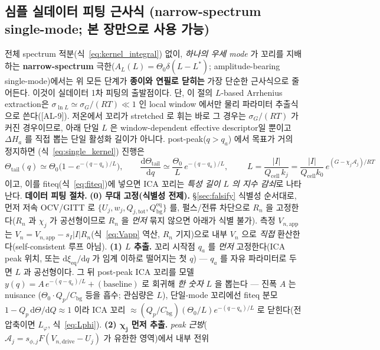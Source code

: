 \documentclass[11pt,a4paper]{article}
\newcommand{\dd}{\mathrm{d}}
\newcommand{\eq}{\mathrm{eq}}
\newcommand{\app}{\mathrm{app}}
\newcommand{\drive}{\mathrm{drive}}
\newcommand{\bg}{\mathrm{bg}}
\newcommand{\cell}{\mathrm{cell}}
\newcommand{\tot}{\mathrm{tot}}
\newcommand{\AL}[1]{\textsf{[AL-#1]}}
\begin{document}
\subsection{심플 실데이터 피팅 근사식 (narrow-spectrum single-mode; 본 장만으로 사용 가능)}\label{sec:ch1_simplefit}
전체 spectrum 적분(식~\eqref{eq:kernel_integral}) 없이, \emph{하나의 우세 mode} 가 꼬리를 지배하는 \textbf{narrow-spectrum}
극한($A_L(L)=\Theta_0\delta(L-L^\ast)$; amplitude-bearing single-mode)에서는 위 모든 단계가 \textbf{종이와 연필로 닫히는}
가장 단순한 근사식으로 줄어든다. 이것이 실데이터 1차 피팅의 출발점이다. 단, 이 절의 $L$-based Arrhenius extraction은
$\sigma_{\ln L}\simeq\sigma_G/(RT)\ll1$ 인 local window 에서만 물리 파라미터 추출식으로 쓴다(\AL{9}). 저온에서 꼬리가
stretched 로 휘는 바로 그 경우는 $\sigma_G/(RT)$ 가 커진 경우이므로, 아래 단일 $L$ 은 window-dependent effective descriptor일
뿐이고 $\Delta H_a$ 를 직접 뽑는 단일 활성화 길이가 아니다. post-peak($q>q_a$) 에서 목표가 거의 정지하면
(식~\eqref{eq:single_kernel}) 진행은
\begin{equation}
\Theta_\mathrm{tail}(q)\simeq\Theta_0\Big(1-e^{-(q-q_a)/L}\Big),\qquad
\frac{\dd\Theta_\mathrm{tail}}{\dd q}\simeq\frac{\Theta_0}{L}\,e^{-(q-q_a)/L},\qquad
\boxed{\;L=\frac{|I|}{Q_\cell\,k_j}=\frac{|I|}{Q_\cell k_0}\,e^{(G-\chi_j\mathcal A_j)/RT}\;}
\label{eq:simplefit}
\end{equation}
이고, 이를 fiteq(식~\eqref{eq:fiteq})에 넣으면 ICA 꼬리는 \emph{특성 길이 $L$ 의 지수 감쇠}로 나타난다.
\textbf{데이터 피팅 절차.}
\textbf{(0) 무대 고정(식별성 전제).} \S\ref{sec:falsify} 식별성 순서대로, 먼저 저속 OCV/GITT 로
$\{U_j,w_j,Q_{j,\tot},Q_\bg^{\eq}\}$ 를, 펄스/전류 차단으로 $R_n$ 을 고정한다($R_n$ 과 $\chi_j$ 가 공선형이므로 $R_n$ 을
\emph{먼저} 묶지 않으면 아래가 식별 불가). 측정 $V_{n,\app}$ 는 $V_n=V_{n,\app}-s_I|I|R_n$(식~\eqref{eq:Vapp} 역산,
$R_n$ 기지)으로 내부 $V_n$ 으로 \emph{직접} 환산한다(self-consistent 루프 아님).
\textbf{(1) $L$ 추출.} 꼬리 시작점 $q_a$ 를 \emph{먼저} 고정한다(ICA peak 위치, 또는 $\dd\xi_{\eq}/\dd q$ 가 임계
이하로 떨어지는 첫 $q$) — $q_a$ 를 자유 파라미터로 두면 $L$ 과 공선형이다. 그 뒤 post-peak ICA 꼬리를
모델 $y(q)=A\,e^{-(q-q_a)/L}+(\text{baseline})$ 로 회귀해 \emph{한 숫자} $L$ 을 뽑는다 — 진폭 $A$ 는 nuisance
($\Theta_0\cdot Q_p/C_\bg$ 등을 흡수; 관심량은 $L$), 단일-mode 꼬리에선 fiteq 분모 $1-Q_p\,\dd\Theta/\dd Q\!\approx\!1$
이라 ICA 꼬리 $\approx(Q_p/C_\bg)(\Theta_0/L)e^{-(q-q_a)/L}$ 로 닫힌다(전압축이면 $L_\varphi$, 식~\eqref{eq:Lphi}).
\textbf{(2) $\boldsymbol{\chi_j}$ 먼저 추출.} \emph{peak 근방}($\mathcal A_j=s_{\phi,j}F(V_{n,\drive}-U_j)$ 가 유한한 영역)에서 내부 전위
\end{document}
